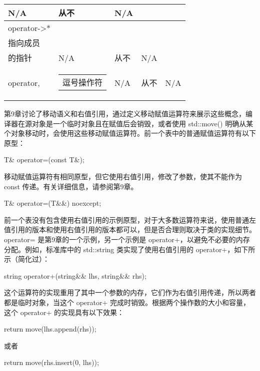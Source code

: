 \begin{longtable}{|l|l|l|l|l|}
N/A &
从不 &
N/A \\ \hline
operator-\textgreater{}* &
\begin{tabular}[c]{@{}l@{}}解引用\\指向成员\\的指针\end{tabular} &
N/A &
从不 &
N/A \\ \hline
operator, &
\begin{tabular}[c]{@{}l@{}}逗号操作符\end{tabular} &
N/A &
从不 &
N/A \\ \hline
\end{longtable}


第9章讨论了移动语义和右值引用，通过定义移动赋值运算符来展示这些概念，编译器在源对象是一个临时对象且在赋值后会销毁，或者使用 std::move() 明确从某个对象移动时，会使用这些移动赋值运算符。前一个表中的普通赋值运算符有以下原型：

\begin{cpp}
T& operator=(const T&);
\end{cpp}

移动赋值运算符有相同原型，但它使用右值引用，修改了参数，使其不能作为 const 传递。有关详细信息，请参阅第9章。

\begin{cpp}
T& operator=(T&&) noexcept;
\end{cpp}

前一个表没有包含使用右值引用的示例原型，对于大多数运算符来说，使用普通左值引用的版本和使用右值引用的版本都可以，但是否合理则取决于类的实现细节。operator= 是第9章的一个示例，另一个示例是 operator+，以避免不必要的内存分配。例如，标准库中的 std::string 类实现了使用右值引用的 operator+，如下所示（简化过）：

\begin{cpp}
string operator+(string&& lhs, string&& rhs);
\end{cpp}

这个运算符的实现重用了其中一个参数的内存，它们作为右值引用传递，所以两者都是临时对象，当这个 operator+ 完成时销毁。根据两个操作数的大小和容量，这个 operator+ 的实现具有以下效果：

\begin{cpp}
return move(lhs.append(rhs));
\end{cpp}

或者

\begin{cpp}
return move(rhs.insert(0, lhs));
\end{cpp}


